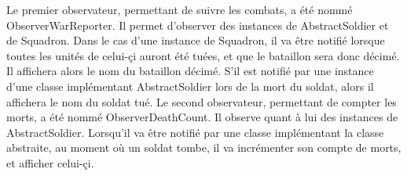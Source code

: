 \documentclass[12pt]{article}
\begin{document}
Le premier observateur, permettant de suivre les combats, a été nommé ObserverWarReporter. Il permet d'observer des instances de AbstractSoldier et de Squadron.
Dans le cas d'une instance de Squadron, il va être notifié lorsque toutes les unités de celui-çi auront été tuées, et que le bataillon sera donc décimé. Il affichera alors le nom du bataillon décimé. S'il est notifié par une instance d'une classe implémentant AbstractSoldier lors de la mort du soldat, alors il affichera le nom du soldat tué.
Le second observateur, permettant de compter les morts, a été nommé ObserverDeathCount. Il observe quant à lui des instances de AbstractSoldier. Lorsqu'il va être notifié par une classe implémentant la classe abstraite, au moment où un soldat tombe, il va incrémenter son compte de morts, et afficher celui-çi.
\end{document}
